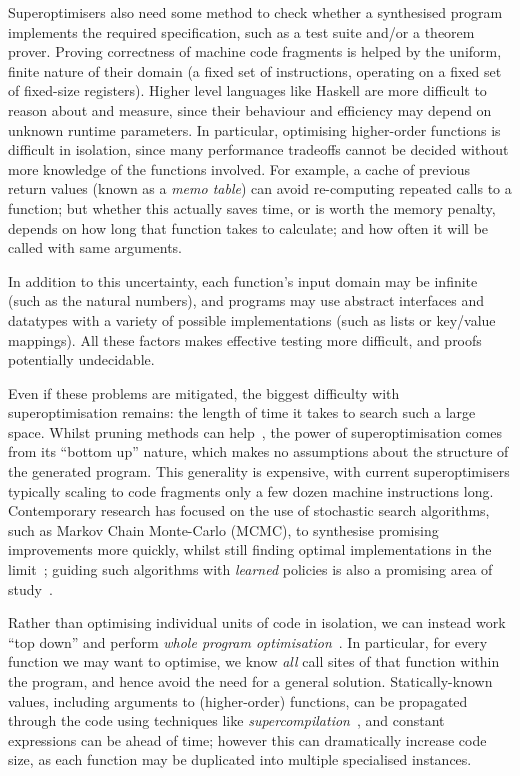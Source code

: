 Superoptimisers also need some method to check whether a synthesised program
implements the required specification, such as a test suite and/or a theorem
prover. Proving correctness of machine code fragments is helped by the uniform,
finite nature of their domain (a fixed set of instructions, operating on a fixed
set of fixed-size registers). Higher level languages like Haskell are more
difficult to reason about and measure, since their behaviour and efficiency may
depend on unknown runtime parameters. In particular, optimising higher-order
functions is difficult in isolation, since many performance tradeoffs cannot be
decided without more knowledge of the functions involved. For example, a cache
of previous return values (known as a \emph{memo table}) can avoid re-computing
repeated calls to a function; but whether this actually saves time, or is worth
the memory penalty, depends on how long that function takes to calculate; and
how often it will be called with same arguments.

In addition to this uncertainty, each function's input domain may be infinite
(such as the natural numbers), and programs may use abstract interfaces and
datatypes with a variety of possible implementations (such as lists or key/value
mappings). All these factors makes effective testing more difficult, and proofs
potentially undecidable.

Even if these problems are mitigated, the biggest difficulty with
superoptimisation remains: the length of time it takes to search such a
large space. Whilst pruning methods can help~\cite{phothilimthana2016scaling},
the power of superoptimisation comes from its ``bottom up'' nature, which makes
no assumptions about the structure of the generated program. This generality is
expensive, with current superoptimisers typically scaling to code fragments only
a few dozen machine instructions long. Contemporary research has focused on the
use of stochastic search algorithms, such as Markov Chain Monte-Carlo (MCMC), to
synthesise promising improvements more quickly, whilst still finding optimal
implementations in the limit~\cite{schkufza2013stochastic}; guiding such
algorithms with \emph{learned} policies is also a promising area of
study~\cite{mudigonda2017learning}.

Rather than optimising individual units of code in isolation, we can instead
work ``top down'' and perform \emph{whole program
  optimisation}~\cite{weeks2006whole,siskind1999flow}. In particular, for every
function we may want to optimise, we know \emph{all} call sites of that function
within the program, and hence avoid the need for a general solution.
Statically-known values, including arguments to (higher-order) functions, can be
propagated through the code using techniques like
\emph{supercompilation}~\cite{Turchin:1986:CS:5956.5957}, and constant
expressions can be ahead of time; however this can dramatically increase code
size, as each function may be duplicated into multiple specialised instances.

